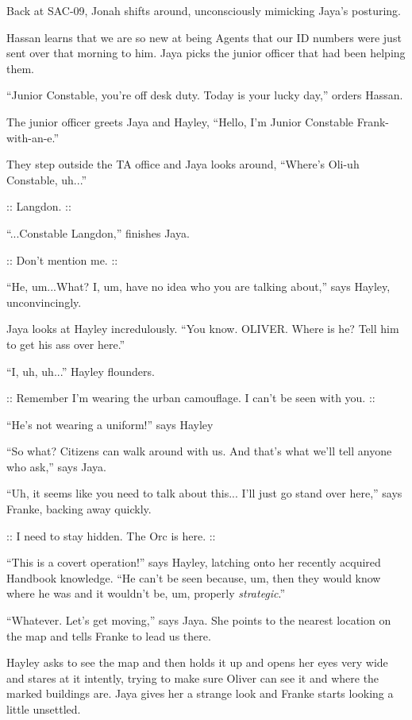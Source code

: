 Back at SAC-09, Jonah shifts around, unconsciously mimicking Jaya's posturing.



Hassan learns that we are so new at being Agents that our ID numbers were just sent over that morning to him.  Jaya picks the junior officer that had been helping them.

``Junior Constable, you're off desk duty.  Today is your lucky day,'' orders Hassan.

The junior officer greets Jaya and Hayley, ``Hello, I'm Junior Constable Frank-with-an-e.''



They step outside the TA office and Jaya looks around, ``Where's Oli-uh Constable, uh...''

:: {\color[RGB]{60,120,216}Langdon.} ::

``...Constable Langdon,'' finishes Jaya.

:: {\color[RGB]{106,168,79}Don't mention me.} ::

``He, um...What?  I, um, have no idea who you are talking about,'' says Hayley, unconvincingly.

Jaya looks at Hayley incredulously.  ``You know.  OLIVER.  Where is he?  Tell him to get his ass over here.''

``I, uh, uh...'' Hayley flounders.

:: {\color[RGB]{106,168,79}Remember I'm wearing the urban camouflage. I can't be seen with you.} ::

``He's not wearing a uniform!'' says Hayley

``So what?  Citizens can walk around with us.  And that's what we'll tell anyone who ask,'' says Jaya.

``Uh, it seems like you need to talk about this... I'll just go stand over here,'' says Franke, backing away quickly.

:: {\color[RGB]{106,168,79}I need to stay hidden.  The Orc is here.} ::

``This is a covert operation!'' says Hayley, latching onto her recently acquired Handbook knowledge.  ``He can't be seen because, um, then they would know where he was and it wouldn't be, um, properly \textit{strategic}.''

``Whatever.  Let's get moving,'' says Jaya.  She points to the nearest location on the map and tells Franke to lead us there.



Hayley asks to see the map and then holds it up and opens her eyes very wide and stares at it intently, trying to make sure Oliver can see it and where the marked buildings are.  Jaya gives her a strange look and Franke starts looking a little unsettled.

